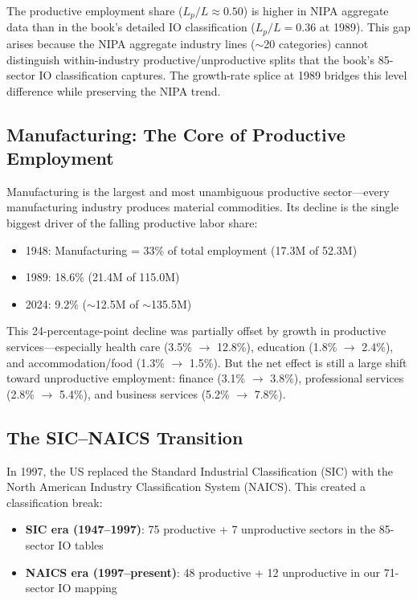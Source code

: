 \documentclass[12pt,a4paper]{article}
\begin{document}
The productive employment share ($L_p/L \approx 0.50$) is higher in NIPA aggregate data than in the book's detailed IO classification ($L_p/L = 0.36$ at 1989). This gap arises because the NIPA aggregate industry lines ($\sim$20 categories) cannot distinguish within-industry productive/unproductive splits that the book's 85-sector IO classification captures. The growth-rate splice at 1989 bridges this level difference while preserving the NIPA trend.

\subsection{Manufacturing: The Core of Productive Employment}

Manufacturing is the largest and most unambiguous productive sector---every manufacturing industry produces material commodities. Its decline is the single biggest driver of the falling productive labor share:

\begin{itemize}
\item 1948: Manufacturing = 33\% of total employment (17.3M of 52.3M)
\item 1989: 18.6\% (21.4M of 115.0M)
\item 2024: 9.2\% ($\sim$12.5M of $\sim$135.5M)
\end{itemize}

This 24-percentage-point decline was partially offset by growth in productive services---especially health care (3.5\% $\rightarrow$ 12.8\%), education (1.8\% $\rightarrow$ 2.4\%), and accommodation/food (1.3\% $\rightarrow$ 1.5\%). But the net effect is still a large shift toward unproductive employment: finance (3.1\% $\rightarrow$ 3.8\%), professional services (2.8\% $\rightarrow$ 5.4\%), and business services (5.2\% $\rightarrow$ 7.8\%).

\subsection{The SIC--NAICS Transition}

In 1997, the US replaced the Standard Industrial Classification (SIC) with the North American Industry Classification System (NAICS). This created a classification break:
\begin{itemize}
\item \textbf{SIC era (1947--1997)}: 75 productive + 7 unproductive sectors in the 85-sector IO tables
\item \textbf{NAICS era (1997--present)}: 48 productive + 12 unproductive in our 71-sector IO mapping
\end{itemize}
\end{document}

